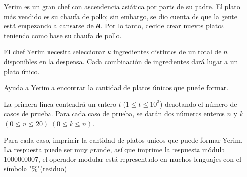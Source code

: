 
Yerim es un gran chef con ascendencia asiática por parte de su padre. El plato más vendido es su chaufa de pollo; sin embargo, se dio cuenta de que la gente está empezando a cansarse de él. Por lo tanto, decide crear nuevos platos teniendo como base su chaufa de pollo.

El chef Yerim necesita seleccionar $k$ ingredientes distintos de un total de $n$ disponibles en la despensa. Cada combinación de ingredientes dará lugar a un plato único.

Ayuda a Yerim a encontrar la cantidad de platos únicos que puede formar.



La primera línea contendrá un entero $t$ ($1\leq t \leq 10^3$) denotando el número de casos de prueba. Para cada caso de prueba, se darán dos números enteros $n$ y $k$ $(0 \leq n \leq20)$ $(0 \leq k \leq n)$.

\outputText

Para cada caso, imprimir la cantidad de platos unicos que puede formar Yerim.\\
La respuesta puede ser muy grande, así que imprime la respuesta módulo 1000000007, el operador modular está representado en muchos lenguajes con el símbolo "\%"(residuo)

\exampleCases

\begin{example}
\end{example}


